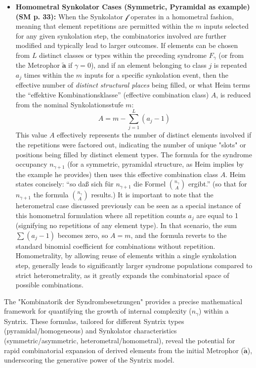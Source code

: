 \documentclass[12pt]{article}
\newcommand{\q}[1]{\enquote{#1}}
\newcommand{\metrophor}{\bm{\widetilde{a}}}
\newcommand{\synkolator}{\mathcal{f}}
\newcommand{\synkolationsstufe}{m}
\newcommand{\syndrom}{F}
\begin{document}
\begin{itemize}
    \item \textbf{Homometral Synkolator Cases (Symmetric, Pyramidal as example) (SM p. 33):}
    When the Synkolator \( \synkolator \) operates in a homometral fashion, meaning that element repetitions are permitted within the \( \synkolationsstufe \) inputs selected for any given synkolation step, the combinatorics involved are further modified and typically lead to larger outcomes. If elements can be chosen from \( L \) distinct classes or types within the preceding syndrome \( \syndrom_\gamma \) (or from the Metrophor \( \metrophor \) if \( \gamma=0 \)), and if an element belonging to class \( j \) is repeated \( a_j \) times within the \( \synkolationsstufe \) inputs for a specific synkolation event, then the effective number of \textit{distinct structural places} being filled, or what Heim terms the \q{effektive Kombinationsklasse} (effective combination class) \( A \), is reduced from the nominal Synkolationsstufe \( \synkolationsstufe \):
    \begin{equation*}
    A = \synkolationsstufe - \sum_{j=1}^L (a_j - 1)
    \end{equation*}
    This value \( A \) effectively represents the number of distinct elements involved if the repetitions were factored out, indicating the number of unique "slots" or positions being filled by distinct element types. The formula for the syndrome occupancy \( n_{\gamma+1} \) (for a symmetric, pyramidal structure, as Heim implies by the example he provides) then uses this effective combination class \( A \). Heim states concisely: \q{so daß sich für \( n_{\gamma+1} \) die Formel \( \binom{n_\gamma}{A} \) ergibt.} (so that for \( n_{\gamma+1} \) the formula \( \binom{n_\gamma}{A} \) results.)
    It is important to note that the heterometral case discussed previously can be seen as a special instance of this homometral formulation where all repetition counts \( a_j \) are equal to 1 (signifying no repetitions of any element type). In that scenario, the sum \( \sum (a_j - 1) \) becomes zero, so \( A = \synkolationsstufe \), and the formula reverts to the standard binomial coefficient for combinations without repetition. Homometrality, by allowing reuse of elements within a single synkolation step, generally leads to significantly larger syndrome populations compared to strict heterometrality, as it greatly expands the combinatorial space of possible combinations.
\end{itemize}

The "Kombinatorik der Syndrombesetzungen" provides a precise mathematical framework for quantifying the growth of internal complexity (\(n_\gamma\)) within a Syntrix. These formulas, tailored for different Syntrix types (pyramidal/homogeneous) and Synkolator characteristics (symmetric/asymmetric, heterometral/homometral), reveal the potential for rapid combinatorial expansion of derived elements from the initial Metrophor (\(\metrophor\)), underscoring the generative power of the Syntrix model.
\end{document}
